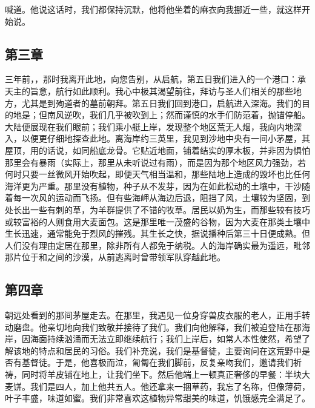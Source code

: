 喊道。他说这话时，我们都保持沉默，他将他坐着的麻衣向我挪近一些，就这样开始说。\par


\subsection{第三章}

三年前，，那时我离开此地，向您告别，从启航，第五日我们进入的一个港口：承天主的旨意，航行如此顺利。我心中极其渴望前往，拜访与圣人们相关的那些地方，尤其是到殉道者的墓前朝拜。第五日我们回到港口，启航进入深海。我们的目的地是；但南风逆吹，我们几乎被吹到上；然而谨慎的水手们防范着，抛锚停船。大陆便展现在我们眼前；我们乘小艇上岸，发现整个地区荒无人烟，我向内地深入，以便更仔细地探查此地。离海岸约三英里，我见到沙地中央有一间小茅屋，其屋顶，用的话说，如同船底龙骨。它贴近地面，铺着结实的厚木板，并非因为惧怕那里会有暴雨（实际上，那里从未听说过有雨），而是因为那个地区风力强劲，若何时只要一丝微风开始吹起，即便天气相当温和，那些陆地上造成的毁坏也比任何海洋更为严重。那里没有植物，种子从不发芽，因为在如此松动的土壤中，干沙随着每一次风的运动而飞扬。但有些海岬从海边后退，阻挡了风，土壤较为坚固，到处长出一些有刺的草，为羊群提供了不错的牧草。居民以奶为生，而那些较有技巧或较富裕的人则食用大麦面包。这是那里唯一茂盛的谷物，因为大麦在那类土壤中生长迅速，通常能免于烈风的摧残。其生长之快，据说播种后第三十日便成熟。但人们没有理由定居在那里，除非所有人都免于纳税。人的海岸确实最为遥远，毗邻那片位于和之间的沙漠，从前逃离时曾带领军队穿越此地。\par


\subsection{第四章}

朝远处看到的那间茅屋走去。在那里，我遇见一位身穿兽皮衣服的老人，正用手转动磨盘。他亲切地向我们致敬并接待了我们。我们向他解释，我们被迫登陆在那海岸，因海面持续汹涌而无法立即继续航行；我们上岸后，如常人本性使然，希望了解该地的特点和居民的习俗。我们补充说，我们是基督徒，主要询问在这荒野中是否有基督徒。于是，他喜极而泣，匍匐在我们脚前，反复亲吻我们，邀请我们祈祷，同时将羊皮铺在地上，让我们坐下。然后他端上一顿真正奢侈的早餐：半块大麦饼。我们是四人，加上他共五人。他还拿来一捆草药，我忘了名称，但像薄荷，叶子丰盛，味道如蜜。我们非常喜欢这植物异常甜美的味道，饥饿感完全满足了。\par

